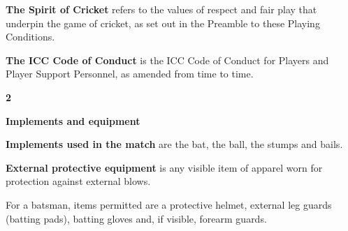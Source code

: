 \documentclass[12pt]{article}
\begin{document}
\vspace{\baselineskip}
\begin{adjustwidth}{0.4in}{0.04in}
{\fontsize{9pt}{10.8pt} \tabto{0.39in} \textbf{The Spirit of Cricket }refers to the values of respect and fair play that underpin the game of cricket, as set out\textbf{ }in the Preamble to these Playing Conditions.\par}\par

\end{adjustwidth}


\vspace{\baselineskip}
\begin{adjustwidth}{0.4in}{0.5in}
{\fontsize{9pt}{10.8pt} \tabto{0.39in} \textbf{The ICC Code of Conduct }is the ICC Code of Conduct for Players and Player Support Personnel, as\textbf{ }amended from time to time.\par}\par

\end{adjustwidth}


\vspace{\baselineskip}
{\fontsize{16pt}{19.2pt}\selectfont \textbf{2 \tabto{0.29in} }{\fontsize{15pt}{18.0pt}\selectfont \textbf{Implements and equipment}\par}\par}\par


\vspace{\baselineskip}
{\fontsize{9pt}{10.8pt} \tabto{0.39in} \textbf{Implements used in the match }are the bat, the ball, the stumps and bails.\par}\par


\vspace{\baselineskip}
{\fontsize{9pt}{10.8pt} \tabto{0.39in} {\fontsize{8pt}{9.6pt}\selectfont \textbf{External protective equipment }is any visible item of apparel worn for protection against external blows.\par}\par}\par


\vspace{\baselineskip}
\begin{adjustwidth}{0.49in}{0.21in}
{\fontsize{9pt}{10.8pt}\selectfont For a batsman, items permitted are a protective helmet, external leg guards (batting pads), batting gloves and, if visible, forearm guards.\par}\par

\end{adjustwidth}
\end{document}
